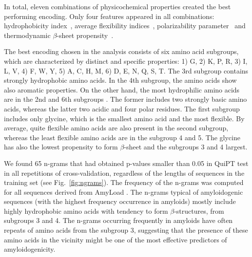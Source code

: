 \documentclass[fleqn,10pt,twoside]{gcb15submission}
\begin{document}
In total, eleven combinations of physicochemical properties created the best 
performing encoding. Only four features appeared in all combinations: 
hydrophobicity index~\citep{argos_structural_1982}, average flexibility 
indices~\citep{bhaskaran_positional_1988}, polarizability 
parameter~\citep{charton_structural_1982} and thermodynamic $\beta$-sheet 
propensity~\citep{kim_thermodynamic_1993}.

  The best encoding chosen in the analysis consists of six amino acid subgroups, 
which are characterized by distinct and specific properties: 1) G, 2) K, P, R, 
3) I, L, V, 4) F, W, Y, 5) A, C, H, M, 6) D, E, N, Q, S, T. The 3rd subgroup contains strongly hydrophobic amino 
acids. In the 4th subgroup, the amino acids show also aromatic properties. On 
the other hand, the most hydrophilic amino acids are in the 2nd and 6th 
subgroups . The former includes two strongly basic amino acids, whereas the latter 
%
%
%
%
%
two acidic and four polar residues. The first subgroup includes only glycine, 
which is the smallest amino acid and the most flexible.  By average, quite 
flexible amino acids are also present in the second subgroup, whereas the least 
flexible amino acids are in the subgroup 4 and 5. The glycine has also the 
lowest propensity to form $\beta$-sheet and the subgroups 3 and 4 largest. 

  We found 65 n-grams that had  obtained p-values smaller than 0.05 in QuiPT test 
%
%
%
%
%
in all repetitions of cross-validation, regardless of the lengths of sequences in 
the training set (see Fig.~\ref{fig:ngrams}). The frequency of the n-grams was 
computed for all sequences derived from AmyLoad . The n-grams typical of 
amyloidogenic sequences (with the highest frequency occurrence in amyloids) mostly  include 
highly hydrophobic amino acids with tendency to form $\beta$-structures, 
from subgroups 3 and 4. The n-grams occurring frequently in amyloids have often 
repeats of amino acids from the subgroup 3, suggesting that the presence of 
these amino acids in the vicinity might be one of the most effective predictors of 
amyloidogenicity.
\end{document}
